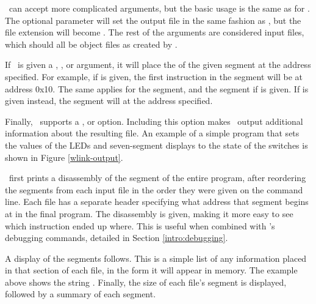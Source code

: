 \wlink\ can accept more complicated arguments, but the basic usage is
the same as for \wasm. The optional  parameter will set
the output file in the same fashion as \wasm, but the file extension will
become . The rest of the arguments are considered input files,
which should all be object files as created by \wasm.

If \wlink\ is given a , , or  argument, 
it will place the  of the given segment at the address specified. For
example, if  is given, the first instruction in the
 segment will be at address 0x10. The same applies for the
 segment, and the  segment if  is given. If
 is given instead, the  segment will  at the
address specified.

Finally, \wlink\ supports a , or  option. Including this
option makes \wlink\ output additional information about the resulting
 file. An example of a simple program that sets the values
of the LEDs and seven-segment displays to the state of the switches is shown
in Figure \ref{wlink-output}.

\wlink\ first prints a disassembly of the  segment of the entire
program, after reordering the  segments from each input file in the
order they were given on the command line. Each file has a separate header
specifying what address that segment begins at in the final program. The
disassembly is given, making it more easy to see which instruction ended up
where. This is useful when combined with \WRAMPmon's debugging commands,
detailed in Section \ref{intro:debugging}.

A display of the  segments follows. This is a simple list of any
information placed in that section of each file, in the form it will appear
in memory. The example above shows the string . Finally, the
size of each file's  segment is displayed, followed by a summary
of each segment.

